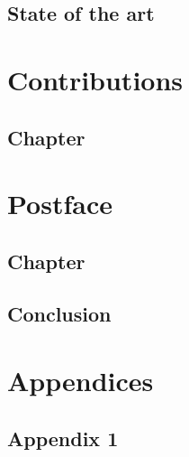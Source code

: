 \documentclass[crop]{style/umemoir} %
\begin{document}

\chapter{State of the art}
\label{chapter:state_of_the_art}
%


\part{Contributions}
\label{part:contribution}


\label{chapter:chapter}
\chapter{Chapter}



\part{Postface}
\label{part:postface}


\chapter{Chapter}
\label{chapter:chapter}
%


\chapter{Conclusion}
\label{chapter:conclusion}



\part{Appendices}
\label{part:appendices}

\begin{appendices}

\chapter{Appendix 1}

\end{appendices}
\end{document}
